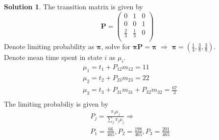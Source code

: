 \documentclass[a4paper, 10pt]{article}
\theoremstyle{definition}
\theoremstyle{hSol}
\newtheorem*{solution}{Solution}
\begin{document}
\begin{solution} The transition matrix is given by 
\begin{equation}
  \bm{P} = \begin{pmatrix}
    0 & 1 & 0 \\
    0 & 0 & 1 \\
    \frac{2}{3} & \frac{1}{3} & 0\\
  \end{pmatrix}
\end{equation}
Denote limiting probability as $\bm{\pi}$, solve for $\bm{\pi}\bm{P}=\bm{\pi}$ $\Rightarrow$ $\bm{\pi}=(\frac{1}{4}, \frac{3}{8}, \frac{3}{8})$. \\
Denote mean time spent in state $i$ as $\mu_i$. 
\begin{equation}
  \begin{split}
    & \mu_1 = t_1 + P_{12}m_{12} = 11 \\
    & \mu_2 = t_2 + P_{23}m_{23} = 22 \\
    & \mu_3 = t_3 + P_{31}m_{31} + P_{32}m_{32} = \frac{67}{3}\\
  \end{split}
\end{equation}
The limiting probabiliy is given by
\begin{equation}
  \begin{split}
    & P_j = \frac{\pi_j \mu_j}{\sum_j \pi_j \mu_j} \Rightarrow \\
    & P_1 = \frac{66}{465}, P_2 = \frac{198}{465}, P_3 = \frac{201}{465}
  \end{split}
\end{equation}
\end{solution}
\end{document}
